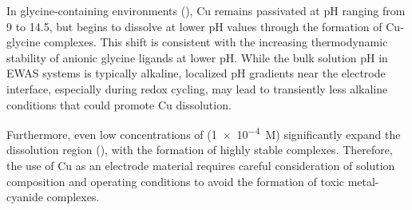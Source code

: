 \documentclass[journal=jacsat,manuscript=article]{achemso}
\begin{document}
In glycine-containing environments (), Cu remains passivated at pH ranging from 9 to 14.5, but begins to dissolve at lower pH values through the formation of Cu-glycine complexes. This shift is consistent with the increasing thermodynamic stability of anionic glycine ligands at lower pH. While the bulk solution pH in EWAS systems is typically alkaline, localized pH gradients near the electrode interface, especially during redox cycling, may lead to transiently less alkaline conditions that could promote Cu dissolution.

Furthermore, even low concentrations of  (\num{1e-4}~M) significantly expand the dissolution region (), with the formation of highly stable  complexes. Therefore, the use of Cu as an electrode material requires careful consideration of solution composition and operating conditions to avoid the formation of toxic metal-cyanide complexes.


\end{document}
